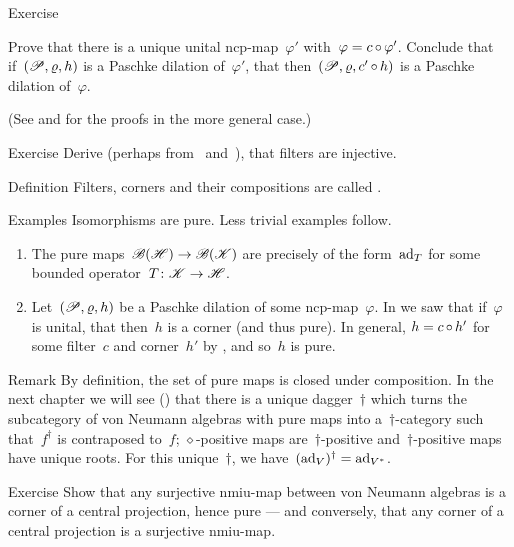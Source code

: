 \documentclass[b]{subfiles}
\begin{document}
\begin{parsec}
\begin{point}{Exercise}
\begin{enumerate}
    Prove that there is a unique unital ncp-map~$\varphi'$
        with~$\varphi = c \mathop{\circ} \varphi'$.
    Conclude that if~$(\mathscr{P}, \varrho, h)$ is a Paschke dilation
            of~$\varphi'$,
            that then~$(\mathscr{P}, \varrho, c' \mathop{\circ} h)$
            is a Paschke dilation of~$\varphi$.
\end{enumerate}
(See  and  for the proofs
        in the more general case.)
\end{point}
\begin{point}{Exercise}%
Derive (perhaps from~ and~),
    that filters are injective.
\end{point}
\end{parsec}
\begin{parsec}%
\begin{point}{Definition}%
    Filters, corners and their compositions are called .
\end{point}
\begin{point}{Examples}%
Isomorphisms are pure.  Less trivial examples follow.
\begin{enumerate}
\item
The pure maps~$\mathscr{B}(\mathscr{H}) \to \mathscr{B}(\mathscr{K})$
    are precisely of the form~$\mathrm{ad}_T$
    for some bounded operator~$T\colon \mathscr{K} \to \mathscr{H}$.
\item
Let~$(\mathscr{P}, \varrho, h)$ be a Paschke dilation of some ncp-map~$\varphi$.
In  we saw that if~$\varphi$ is unital,
        that then~$h$ is a corner (and thus pure).
In general, $h = c \mathop{\circ} h'$ for some filter~$c$ and corner~$h'$
    by ,
        and so~$h$ is pure.
\end{enumerate}
\end{point}
\begin{point}{Remark}%
By definition, the set of pure maps is closed under composition.
In the next chapter we will see () that
    there is a unique dagger~$\dagger$
    which turns the subcategory of von Neumann
    algebras with pure maps into a~$\dagger$-category
    such that~$f^\dagger$ is contraposed to~$f$;
            $\diamond$-positive maps are~$\dagger$-positive
            and~$\dagger$-positive maps have unique roots.
For this unique~$\dagger$, we have~$(\mathrm{ad}_V)^\dagger = \mathrm{ad}_{V^*}$.
\end{point}
\begin{point}{Exercise}%
Show that any surjective nmiu-map between von Neumann algebras
        is a corner of a central projection, hence pure
        --- and conversely,
        that any corner of a central projection is a surjective nmiu-map.
\end{point}
\end{parsec}
\end{document}

